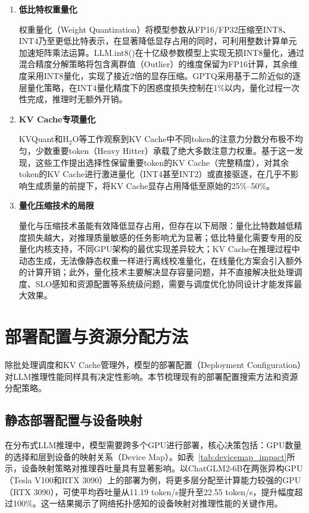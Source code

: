 \begin{enumerate}
    
\item \textbf{低比特权重量化}

权重量化（Weight Quantization）将模型参数从FP16/FP32压缩至INT8、INT4乃至更低比特表示，在显著降低显存占用的同时，可利用整数计算单元加速矩阵乘法运算。LLM.int8()\cite{dettmers2022llm}在十亿级参数模型上实现无损INT8量化，通过混合精度分解策略将包含离群值（Outlier）的维度保留为FP16计算，其余维度采用INT8量化，实现了接近2倍的显存压缩。GPTQ\cite{frantar2022gptq}采用基于二阶近似的逐层量化策略，在INT4量化精度下的困惑度损失控制在1\%以内，量化过程一次性完成，推理时无额外开销。

\item \textbf{KV Cache专项量化}

KVQuant\cite{hooper2024kvquant}和H$_2$O\cite{zhang2023h2o}等工作观察到KV Cache中不同token的注意力分数分布极不均匀，少数重要token（Heavy Hitter）承载了绝大多数注意力权重。基于这一发现，这些工作提出选择性保留重要token的KV Cache（完整精度），对其余token的KV Cache进行激进量化（INT4甚至INT2）或直接驱逐，在几乎不影响生成质量的前提下，将KV Cache显存占用降低至原始的25\%--50\%。

\item \textbf{量化压缩技术的局限}

量化与压缩技术虽能有效降低显存占用，但存在以下局限：量化比特数越低精度损失越大，对推理质量敏感的任务影响尤为显著；低比特量化需要专用的反量化内核支持，不同GPU架构的最优实现差异较大；KV Cache在推理过程中动态生成，无法像静态权重一样进行离线校准量化，在线量化方案会引入额外的计算开销；此外，量化技术主要解决显存容量问题，并不直接解决批处理调度、SLO感知和资源配置等系统级问题，需要与调度优化协同设计才能发挥最大效果。

\end{enumerate}

\section{部署配置与资源分配方法}

除批处理调度和KV Cache管理外，模型的部署配置（Deployment Configuration）对LLM推理性能同样具有决定性影响。本节梳理现有的部署配置搜索方法和资源分配策略。

\subsection{静态部署配置与设备映射}

在分布式LLM推理中，模型需要跨多个GPU进行部署，核心决策包括：GPU数量的选择和层到设备的映射关系（Device Map）。如表~\ref{tab:devicemap_impact}所示，设备映射策略对推理吞吐量具有显著影响\cite{he2024uellm}。以ChatGLM2-6B在两张异构GPU（Tesla V100和RTX 3090）上的部署为例，将更多层分配至计算能力较强的GPU（RTX 3090），可使平均吞吐量从11.19 token/s提升至22.55 token/s，提升幅度超过100\%。这一结果揭示了网络拓扑感知的设备映射对推理性能的关键作用。

